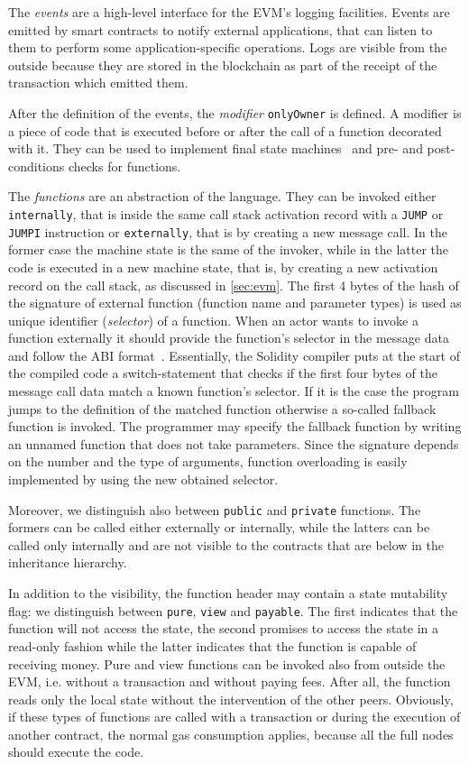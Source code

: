 The \emph{events} are a high-level interface for the EVM's logging
facilities. Events are emitted by smart contracts to notify external
applications, that can listen to them to perform some application-specific
operations. Logs are visible from the outside because they are stored
in the blockchain as part of the receipt of the transaction which emitted them.

After the definition of the events, the \emph{modifier} \verb|onlyOwner| is
defined. A modifier is a piece of code that is executed before or after the
call of a function decorated with it. They can be used to implement final
state machines~\cite{bib:solidity-docs} and pre- and post-conditions checks for
functions.

The \emph{functions} are an abstraction of the language. They can be invoked
either \texttt{internally}, that is inside the same call stack activation record
with a \texttt{JUMP} or \texttt{JUMPI} instruction or \texttt{externally}, that
is by creating a new message call. In the former case the machine state is the
same of the invoker, while in the latter the code is executed in a new machine
state, that is, by creating a new activation record on the call stack, as
discussed in \autoref{sec:evm}. The first 4 bytes of the hash of the signature
of external function (function name and parameter types) is used as unique
identifier (\emph{selector}) of a function. When an actor wants to invoke a
function externally it should provide the function's selector in the message
data and follow the ABI format~\cite{bib:solidity-docs}. Essentially, the
Solidity compiler puts at the start of the compiled code a switch-statement that
checks if the first four bytes of the message call data match a known function's
selector. If it is the case the program jumps to the definition of the matched
function otherwise a so-called fallback function is invoked. The programmer may
specify the fallback function by writing an unnamed function that does not take
parameters. Since the signature depends on the number and the type of arguments,
function overloading is easily implemented by using the new obtained selector.

Moreover, we distinguish also between \texttt{public} and \texttt{private}
functions. The formers can be called either externally or internally, while the
latters can be called only internally and are not visible to the contracts that
are below in the inheritance hierarchy.

In addition to the visibility, the function header may contain a state
mutability flag: we distinguish between \texttt{pure}, \texttt{view} and
\texttt{payable}. The first indicates that the function will not access the
state, the second promises to access the state in a read-only fashion while the
latter indicates that the function is capable of receiving money.
Pure and view functions can be invoked also from outside the EVM, i.e. without
a transaction and without paying fees. After all, the function reads only the
local state without the intervention of the other peers.
Obviously, if these types of functions are called with a transaction or during
the execution of another contract, the normal gas consumption applies, because
all the full nodes should execute the code.




